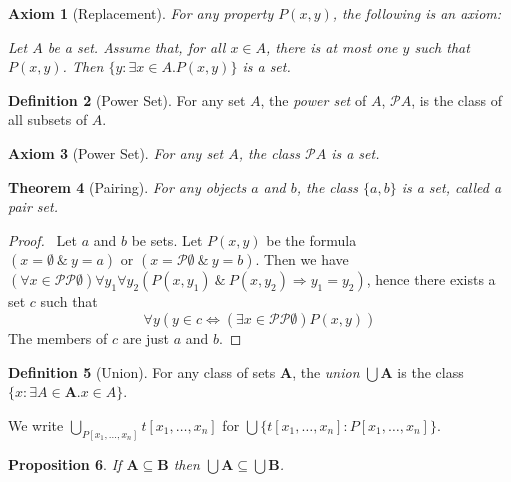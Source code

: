 \documentclass{article}
\let\qed\relax
\newtheorem{axiom}{Axiom}
\newtheorem{proposition}[axiom]{Proposition}
\newtheorem{theorem}[axiom]{Theorem}
\theoremstyle{definition}
\newtheorem{definition}[axiom]{Definition}
\begin{document}
    \begin{axiom}[Replacement]
        For any property $P(x,y)$, the following is an axiom:

        Let $A$ be a set. Assume that, for all $x \in A$, there is at most one $y$ such that $P(x,y)$.
        Then $\{ y : \exists x \in A. P(x,y) \}$ is a set.
    \end{axiom}

    \begin{definition}[Power Set]
        For any set $A$, the \emph{power set} of $A$, $\mathcal{P} A$, is the class of all subsets of $A$.
    \end{definition}

    \begin{axiom}[Power Set]
        For any set $A$, the class $\mathcal{P} A$ is a set.
    \end{axiom}

    \begin{theorem}[Pairing]
        For any objects $a$ and $b$, the class $\{a,b\}$ is a set, called a \emph{pair set}.
    \end{theorem}

    \begin{proof}
        \pf\      Let $a$ and $b$ be sets. Let $P(x,y)$ be the formula $(x = \emptyset \ \&\ y = a) \text{ or }
        (x = \mathcal{P} \emptyset \ \&\ y = b)$. Then we have $(\forall x \in \mathcal{P} \mathcal{P}
        \emptyset) \forall y_1 \forall y_2 (P(x,y_1) \ \&\ P(x,y_2) \Rightarrow y_1 = y_2)$,
        hence there exists a set $c$ such that
        \[ \forall y (y \in c \Leftrightarrow (\exists x \in \mathcal{P} \mathcal{P} \emptyset) P(x,y)) \]
        The members of $c$ are just $a$ and $b$. \qed   
    \end{proof}

    \begin{definition}[Union]
        For any class of sets $\mathbf{A}$, the \emph{union} $\bigcup \mathbf{A}$ is the class
        $\{ x : \exists A \in \mathbf{A}. x \in A \}$.

        We write $\bigcup_{P[x_1, \ldots, x_n]} t[x_1, \ldots, x_n]$ for $\bigcup \{ t[x_1, \ldots, x_n]
        : P[x_1, \ldots, x_n] \}$.
    \end{definition}

    \begin{proposition}
        If $\mathbf{A} \subseteq \mathbf{B}$ then $\bigcup \mathbf{A} \subseteq \bigcup \mathbf{B}$.
    \end{proposition}
\end{document}
